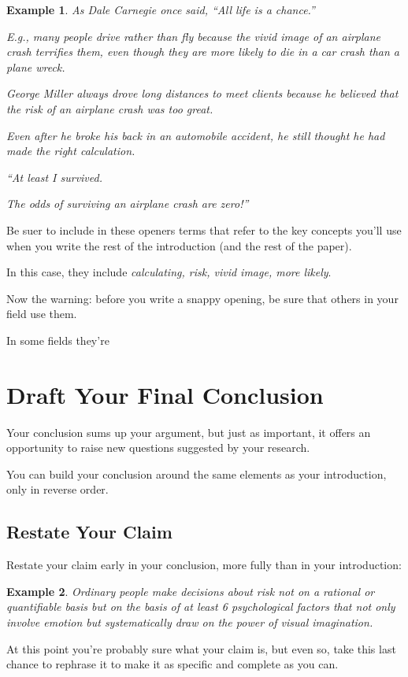\documentclass[oneside]{book}
\numberwithin{equation}{section}
\newtheorem{example}{Example}[section]
\begin{document}
\begin{example}
    As Dale Carnegie once said, ``All life is a chance.''
    
    E.g., many people drive rather than fly because the vivid image of an airplane crash terrifies them, even though they are more likely to die in a car crash than a plane wreck.
    
    George Miller always drove long distances to meet clients because he believed that the risk of an airplane crash was too great.
    
    Even after he broke his back in an automobile accident, he still thought he had made the right calculation.
    
    ``At least I survived.
    
    The odds of surviving an airplane crash are zero!''
\end{example}
Be suer to include in these openers terms that refer to the key concepts you'll use when you write the rest of the introduction (and the rest of the paper).

In this case, they include \textit{calculating, risk, vivid image, more likely}.

%
Now the warning: before you write a snappy opening, be sure that others in your field use them.

In some fields they're 

\section{Draft Your Final Conclusion}
Your conclusion sums up your argument, but just as important, it offers an opportunity to raise new questions suggested by your research.

You can build your conclusion around the same elements as your introduction, only in reverse order.

\subsection{Restate Your Claim}
Restate your claim early in your conclusion, more fully than in your introduction:
\begin{example}
    Ordinary people make decisions about risk not on a rational or quantifiable basis but on the basis of at least 6 psychological factors that not only involve emotion but systematically draw on the power of visual imagination.
\end{example}
At this point you're probably sure what your claim is, but even so, take this last chance to rephrase it to make it as specific and complete as you can.
\end{document}
